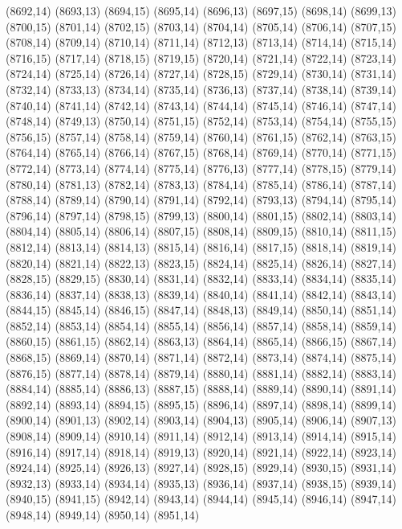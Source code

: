 (8692,14)
(8693,13)
(8694,15)
(8695,14)
(8696,13)
(8697,15)
(8698,14)
(8699,13)
(8700,15)
(8701,14)
(8702,15)
(8703,14)
(8704,14)
(8705,14)
(8706,14)
(8707,15)
(8708,14)
(8709,14)
(8710,14)
(8711,14)
(8712,13)
(8713,14)
(8714,14)
(8715,14)
(8716,15)
(8717,14)
(8718,15)
(8719,15)
(8720,14)
(8721,14)
(8722,14)
(8723,14)
(8724,14)
(8725,14)
(8726,14)
(8727,14)
(8728,15)
(8729,14)
(8730,14)
(8731,14)
(8732,14)
(8733,13)
(8734,14)
(8735,14)
(8736,13)
(8737,14)
(8738,14)
(8739,14)
(8740,14)
(8741,14)
(8742,14)
(8743,14)
(8744,14)
(8745,14)
(8746,14)
(8747,14)
(8748,14)
(8749,13)
(8750,14)
(8751,15)
(8752,14)
(8753,14)
(8754,14)
(8755,15)
(8756,15)
(8757,14)
(8758,14)
(8759,14)
(8760,14)
(8761,15)
(8762,14)
(8763,15)
(8764,14)
(8765,14)
(8766,14)
(8767,15)
(8768,14)
(8769,14)
(8770,14)
(8771,15)
(8772,14)
(8773,14)
(8774,14)
(8775,14)
(8776,13)
(8777,14)
(8778,15)
(8779,14)
(8780,14)
(8781,13)
(8782,14)
(8783,13)
(8784,14)
(8785,14)
(8786,14)
(8787,14)
(8788,14)
(8789,14)
(8790,14)
(8791,14)
(8792,14)
(8793,13)
(8794,14)
(8795,14)
(8796,14)
(8797,14)
(8798,15)
(8799,13)
(8800,14)
(8801,15)
(8802,14)
(8803,14)
(8804,14)
(8805,14)
(8806,14)
(8807,15)
(8808,14)
(8809,15)
(8810,14)
(8811,15)
(8812,14)
(8813,14)
(8814,13)
(8815,14)
(8816,14)
(8817,15)
(8818,14)
(8819,14)
(8820,14)
(8821,14)
(8822,13)
(8823,15)
(8824,14)
(8825,14)
(8826,14)
(8827,14)
(8828,15)
(8829,15)
(8830,14)
(8831,14)
(8832,14)
(8833,14)
(8834,14)
(8835,14)
(8836,14)
(8837,14)
(8838,13)
(8839,14)
(8840,14)
(8841,14)
(8842,14)
(8843,14)
(8844,15)
(8845,14)
(8846,15)
(8847,14)
(8848,13)
(8849,14)
(8850,14)
(8851,14)
(8852,14)
(8853,14)
(8854,14)
(8855,14)
(8856,14)
(8857,14)
(8858,14)
(8859,14)
(8860,15)
(8861,15)
(8862,14)
(8863,13)
(8864,14)
(8865,14)
(8866,15)
(8867,14)
(8868,15)
(8869,14)
(8870,14)
(8871,14)
(8872,14)
(8873,14)
(8874,14)
(8875,14)
(8876,15)
(8877,14)
(8878,14)
(8879,14)
(8880,14)
(8881,14)
(8882,14)
(8883,14)
(8884,14)
(8885,14)
(8886,13)
(8887,15)
(8888,14)
(8889,14)
(8890,14)
(8891,14)
(8892,14)
(8893,14)
(8894,15)
(8895,15)
(8896,14)
(8897,14)
(8898,14)
(8899,14)
(8900,14)
(8901,13)
(8902,14)
(8903,14)
(8904,13)
(8905,14)
(8906,14)
(8907,13)
(8908,14)
(8909,14)
(8910,14)
(8911,14)
(8912,14)
(8913,14)
(8914,14)
(8915,14)
(8916,14)
(8917,14)
(8918,14)
(8919,13)
(8920,14)
(8921,14)
(8922,14)
(8923,14)
(8924,14)
(8925,14)
(8926,13)
(8927,14)
(8928,15)
(8929,14)
(8930,15)
(8931,14)
(8932,13)
(8933,14)
(8934,14)
(8935,13)
(8936,14)
(8937,14)
(8938,15)
(8939,14)
(8940,15)
(8941,15)
(8942,14)
(8943,14)
(8944,14)
(8945,14)
(8946,14)
(8947,14)
(8948,14)
(8949,14)
(8950,14)
(8951,14)
